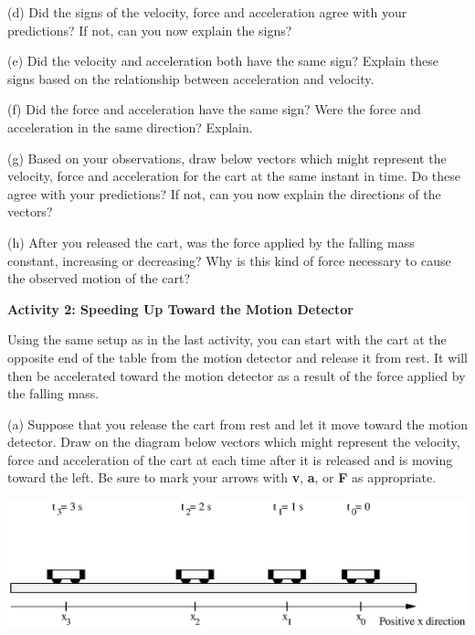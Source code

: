 (d) Did the signs of the velocity, force and acceleration agree with your predictions?
If not, can you now explain the signs?
\answerspace{20mm}

(e) Did the velocity and acceleration both have the same sign? Explain these
signs based on the relationship between acceleration and velocity.
\answerspace{20mm}

\pagebreak[2]
(f) Did the force and acceleration have the same sign? Were the force and acceleration
in the same direction? Explain.
\answerspace{20mm}

(g) Based on your observations, draw below vectors which might represent the
velocity, force and acceleration for the cart at the same instant in time. Do
these agree with your predictions? If not, can you now explain the directions
of the vectors?
\answerspace{20mm}

(h) After you released the cart, was the force applied by the falling mass constant,
increasing or decreasing?  Why is this kind of force necessary to cause
the observed motion of the cart?
\answerspace{20mm}

\textbf{Activity 2: Speeding Up Toward the Motion Detector }

Using the same setup as in the last activity, you can start with the cart at
the opposite end of the table from the motion detector and release it from rest.
It will then be accelerated toward the motion detector as a result of the force
applied by the falling mass.

(a) Suppose that you release the cart from rest and let it move toward the motion
detector. Draw on the diagram below vectors which might represent the velocity,
force and acceleration of the cart at each time after it is released and is
moving toward the left. Be sure to mark your arrows with \textbf{v}, \textbf{a},
or \textbf{F} as appropriate.

\vspace{0.3cm}
{\par\centering \includegraphics{force2/force2_fig5.eps} \par}

